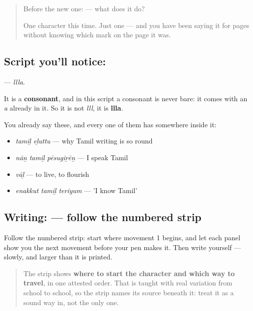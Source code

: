 \label{lesson:TA-S115-letter-llla}



\begin{quote}
Before the new one:  — what does it do?

One character this time. Just one — and you have been saying it for pages without knowing which mark on the page it was.
\end{quote}

\subsection*{Script you'll notice: }
\textbf{} — \emph{llla}.

It is a \textbf{consonant}, and in this script a consonant is never bare: it comes with an \emph{a} already in it. So it is not \emph{lll}, it is \textbf{llla}.

You already say these, and every one of them has  somewhere inside it:

\begin{itemize}
\raggedright
  \item \textbf{ } \emph{tamiḻ eḻuttu} — why Tamil writing is so round
  \item \textbf{  } \emph{nāṉ tamiḻ pēsugiṟēṉ} — I speak Tamil
  \item \textbf{} \emph{vāḻ} — to live, to flourish
  \item \textbf{  } \emph{enakkut tamiḻ teriyum} — 'I know Tamil'
\end{itemize}

\subsection*{Writing:  — follow the numbered strip}

Follow the numbered strip: start where movement 1 begins, and let each panel show you the next movement before your pen makes it. Then write  yourself — slowly, and larger than it is printed.

\begin{quote}
The strip shows \textbf{where to start the character and which way to travel}, in one attested order. That is taught with real variation from school to school, so the strip names its source beneath it: treat it as a sound way in, not the only one.
\end{quote}

